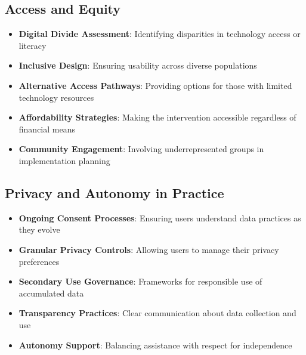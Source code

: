 \subsection{Access and Equity}
\begin{itemize}
    \item \textbf{Digital Divide Assessment}: Identifying disparities in technology access or literacy
    
    \item \textbf{Inclusive Design}: Ensuring usability across diverse populations
    
    \item \textbf{Alternative Access Pathways}: Providing options for those with limited technology resources
    
    \item \textbf{Affordability Strategies}: Making the intervention accessible regardless of financial means
    
    \item \textbf{Community Engagement}: Involving underrepresented groups in implementation planning
\end{itemize}

\subsection{Privacy and Autonomy in Practice}
\begin{itemize}
    \item \textbf{Ongoing Consent Processes}: Ensuring users understand data practices as they evolve
    
    \item \textbf{Granular Privacy Controls}: Allowing users to manage their privacy preferences
    
    \item \textbf{Secondary Use Governance}: Frameworks for responsible use of accumulated data
    
    \item \textbf{Transparency Practices}: Clear communication about data collection and use
    
    \item \textbf{Autonomy Support}: Balancing assistance with respect for independence
\end{itemize}

